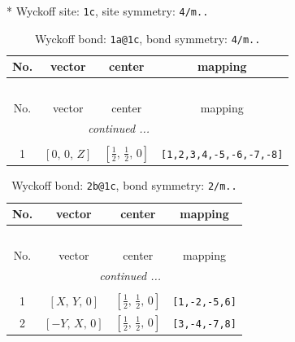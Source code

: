\documentclass[fleqn,8pt]{jsarticle}
\begin{document}
* Wyckoff site: {\tt 1c}, site symmetry: {\tt 4/m..}
\renewcommand{\arraystretch}{1.2}
\begin{longtable}{cccc}
\caption{Wyckoff bond: {\tt 1a@1c}, bond symmetry: {\tt 4/m..}}
 \\
 \hline \hline
No. & vector & center & mapping \\ \hline \endfirsthead

\multicolumn{3}{l}{\tablename\ \thetable{}} \\
 \hline \hline
No. & vector & center & mapping \\ \hline \endhead

 \hline \hline
\multicolumn{3}{r}{\footnotesize\it continued ...} \\ \endfoot

 \hline \hline
\multicolumn{3}{r}{} \\ \endlastfoot

1 & $\left[ 0,\, 0,\, Z \right]$ & $\left[ \frac{1}{2},\, \frac{1}{2},\, 0 \right]$ & {\tt [1,2,3,4,-5,-6,-7,-8]} \\
\end{longtable}
\renewcommand{\arraystretch}{1.2}
\begin{longtable}{cccc}
\caption{Wyckoff bond: {\tt 2b@1c}, bond symmetry: {\tt 2/m..}}
 \\
 \hline \hline
No. & vector & center & mapping \\ \hline \endfirsthead

\multicolumn{3}{l}{\tablename\ \thetable{}} \\
 \hline \hline
No. & vector & center & mapping \\ \hline \endhead

 \hline \hline
\multicolumn{3}{r}{\footnotesize\it continued ...} \\ \endfoot

 \hline \hline
\multicolumn{3}{r}{} \\ \endlastfoot

1 & $\left[ X,\, Y,\, 0 \right]$ & $\left[ \frac{1}{2},\, \frac{1}{2},\, 0 \right]$ & {\tt [1,-2,-5,6]} \\ \hline
2 & $\left[ - Y,\, X,\, 0 \right]$ & $\left[ \frac{1}{2},\, \frac{1}{2},\, 0 \right]$ & {\tt [3,-4,-7,8]} \\
\end{longtable}
\renewcommand{\arraystretch}{1.2}
\end{document}
